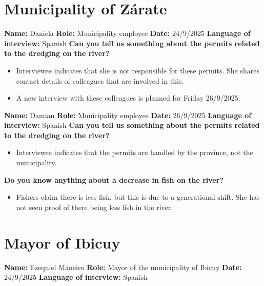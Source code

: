 \section{Municipality of Zárate}
\textbf{Name:} Daniela \newline
\textbf{Role:} Municipality employee \newline
\textbf{Date:} 24/9/2025 \newline
\textbf{Language of interview:} Spanish \newline \newline
\textbf{Can you tell us something about the permits related to the dredging on the river?}
\begin{itemize}
    \item Interviewee indicates that she is not responsible for these permits. She shares contact details of colleagues that are involved in this.
    \item A new interview with these colleagues is planned for Friday 26/9/2025.
\end{itemize}

\textbf{Name:} Damian \newline
\textbf{Role:} Municipality employee \newline
\textbf{Date:} 26/9/2025 \newline
\textbf{Language of interview:} Spanish \newline \newline
\textbf{Can you tell us something about the permits related to the dredging on the river?}
\begin{itemize}
    \item Interviewee indicates that the permits are handled by the province, not the municipality.
\end{itemize}

\textbf{Do you know anything about a decrease in fish on the river?}
\begin{itemize}
    \item Fishers claim there is less fish, but this is due to a generational shift. She has not seen proof of there being less fish in the river.
\end{itemize}


\section{Mayor of Ibicuy}
\textbf{Name:} Ezequiel Maneiro \newline
\textbf{Role:} Mayor of the municipality of Ibicuy \newline
\textbf{Date:} 24/9/2025 \newline
\textbf{Language of interview:} Spanish \newline \newline

